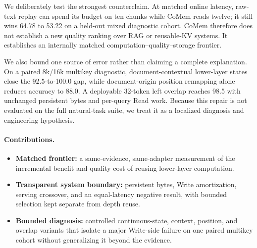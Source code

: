 We deliberately test the strongest counterclaim. At matched online latency,
raw-text replay can spend its budget on ten chunks while CoMem reads twelve; it
still wins 64.78 to 53.22 on a held-out mixed diagnostic cohort. CoMem therefore
does not establish a new quality ranking over RAG or reusable-KV systems. It
establishes an internally matched computation--quality--storage frontier.

We also bound one source of error rather than claiming a complete explanation.
On a paired 8k/16k multikey diagnostic, document-contextual lower-layer states
close the 92.5-to-100.0 gap, while document-origin position remapping alone
reduces accuracy to 88.0. A deployable 32-token left overlap reaches 98.5 with
unchanged persistent bytes and per-query Read work. Because this repair is not
evaluated on the full natural-task suite, we treat it as a localized diagnosis
and engineering hypothesis.

\paragraph{Contributions.}
\begin{itemize}[leftmargin=1.2em,itemsep=1pt,topsep=2pt]
\item \textbf{Matched frontier:} a same-evidence, same-adapter measurement of
the incremental benefit and quality cost of reusing lower-layer computation.
\item \textbf{Transparent system boundary:} persistent bytes, Write
amortization, serving crossover, and an equal-latency negative result, with
bounded selection kept separate from depth reuse.
\item \textbf{Bounded diagnosis:} controlled continuous-state, context,
position, and overlap variants that isolate a major Write-side failure on one
paired multikey cohort without generalizing it beyond the evidence.
\end{itemize}
